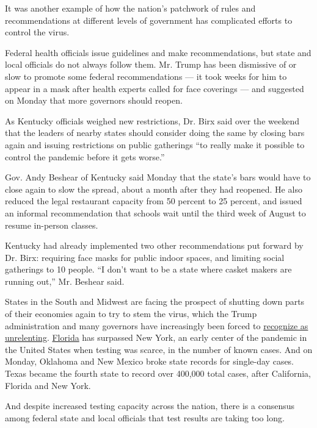 It was another example of how the nation's patchwork of rules and
recommendations at different levels of government has complicated
efforts to control the virus.

Federal health officials issue guidelines and make recommendations, but
state and local officials do not always follow them. Mr. Trump has been
dismissive of or slow to promote some federal recommendations --- it
took weeks for him to appear in a mask after health experts called for
face coverings --- and suggested on Monday that more governors should
reopen.

As Kentucky officials weighed new restrictions, Dr. Birx said over the
weekend that the leaders of nearby states should consider doing the same
by closing bars again and issuing restrictions on public gatherings ``to
really make it possible to control the pandemic before it gets worse.''

Gov. Andy Beshear of Kentucky said Monday that the state's bars would
have to close again to slow the spread, about a month after they had
reopened. He also reduced the legal restaurant capacity from 50 percent
to 25 percent, and issued an informal recommendation that schools wait
until the third week of August to resume in-person classes.

Kentucky had already implemented two other recommendations put forward
by Dr. Birx: requiring face masks for public indoor spaces, and limiting
social gatherings to 10 people. ``I don't want to be a state where
casket makers are running out,'' Mr. Beshear said.

States in the South and Midwest are facing the prospect of shutting down
parts of their economies again to try to stem the virus, which the Trump
administration and many governors have increasingly been forced to
\href{https://www.nytimes3xbfgragh.onion/2020/07/21/us/politics/trump-coronavirus-masks.html}{recognize
as unrelenting}.
\href{https://www.nytimes3xbfgragh.onion/2020/07/26/world/coronavirus-live-updates.html\#link-44261c05}{Florida}
has surpassed New York, an early center of the pandemic in the United
States when testing was scarce, in the number of known cases. And on
Monday, Oklahoma and New Mexico broke state records for single-day
cases. Texas became the fourth state to record over 400,000 total cases,
after California, Florida and New York.

And despite increased testing capacity across the nation, there is a
consensus among federal state and local officials that test results are
taking too long.

